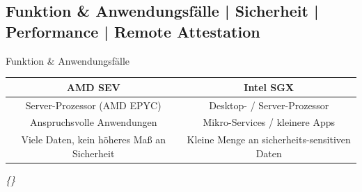 \documentclass{sdqbeamer}
\begin{document}
\subsection{Funktion \& Anwendungsfälle | Sicherheit | Performance | Remote Attestation}

\begin{frame}{Funktion \& Anwendungsfälle}
	\begin{center}
		\begin{tabular}[h]{c|c}
			\color{kitgreen} AMD SEV & \color{kitgreen}Intel SGX \\
			\hline
			Server-Prozessor (AMD EPYC) & Desktop- / Server-Prozessor \\
			Anspruchsvolle Anwendungen & Mikro-Services / kleinere Apps \\
			Viele Daten, kein höheres Maß an Sicherheit & Kleine Menge an sicherheits-sensitiven Daten \\
			
		\end{tabular}
	\end{center}


	\vfill
	\small\textit{\{\cite{mofrad}\}}
\end{frame}
\end{document}
